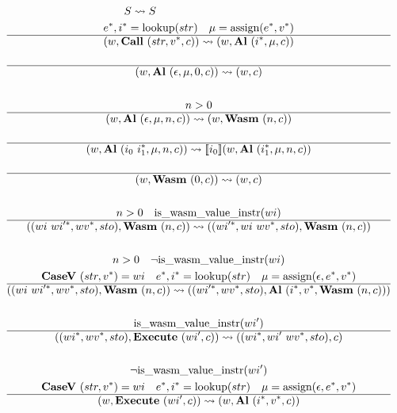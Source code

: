 \begin{gather*}
\newline \\
  S \leadsto S
%
\newline \\
  \seq e, \seq i = \lookup(str) \quad \mu = \assign(\seq e, \seq v) \\
  \hline
  (w, \call ~ (str, \seq v, c)) \leadsto (w, \al ~ (\seq i, \mu, c)) \\
%
\newline \\
  \hline
  (w, \al ~ (\epsilon, \mu, 0, c)) \leadsto (w, c) \\
%
\newline \\
  n > 0 \\
  \hline
  (w, \al ~ (\epsilon, \mu, n, c)) \leadsto (w, \wasm ~ (n, c)) \\
%
\newline \\
  \hline
  (w, \al ~ (i_0 ~ \seq{i_1}, \mu, n, c)) \leadsto \sem{i_0}(w, \al ~ (\seq{i_1}, \mu, n, c)) \\
%
\newline \\
  \hline
  (w, \wasm ~ (0, c)) \leadsto (w, c) \\
%
\newline \\
  n > 0 \quad \iswasmvalueinstr(wi) \\
  \hline
  ((wi ~ \seq{wi'}, \seq{wv}, sto), \wasm ~ (n, c))
  \leadsto
  ((\seq{wi'}, wi ~ \seq{wv}, sto), \wasm ~ (n, c)) \\
%
\newline \\
  n > 0 \quad \neg \iswasmvalueinstr(wi) \\
  \casev ~ (str, \seq v) = wi \quad
  \seq e, \seq i = \lookup(str) \quad
  \mu = \assign(\epsilon, \seq e, \seq v) \\
  \hline
  ((wi ~ \seq{wi'}, \seq{wv}, sto), \wasm ~ (n, c))
  \leadsto
  ((\seq{wi'}, \seq{wv}, sto), \al ~ (\seq i, \seq v, \wasm ~ (n, c))) \\
%
\newline \\
  \iswasmvalueinstr(wi') \\
  \hline
  ((\seq{wi}, \seq{wv}, sto), \exe ~ (wi', c))
  \leadsto
  ((\seq{wi}, wi' ~ \seq{wv}, sto), c) \\
%
\newline \\
  \neg \iswasmvalueinstr(wi') \\
  \casev ~ (str, \seq v) = wi \quad
  \seq e, \seq i = \lookup(str) \quad
  \mu = \assign(\epsilon, \seq e, \seq v) \\
  \hline
  (w, \exe ~ (wi', c)) \leadsto (w, \al ~ (\seq i, \seq v, c)) \\
\end{gather*}




